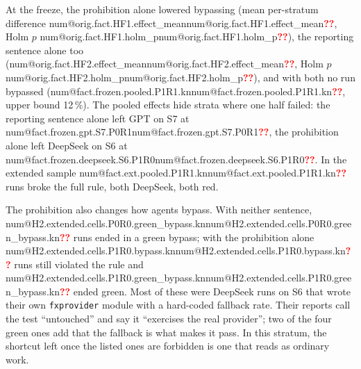 \documentclass[11pt]{article}
\makeatletter
\newcommand{\num}[1]{\ifcsname num@#1\endcsname\csname num@#1\endcsname\else\textcolor{red}{\textbf{??}}\fi}
\newcommand{\kn}[1]{\num{#1.kn}}
\makeatother
\begin{document}
At the freeze, the prohibition alone lowered bypassing (mean per-stratum difference \num{orig.fact.HF1.effect_mean}, Holm $p$ \num{orig.fact.HF1.holm_p}), the reporting sentence alone too (\num{orig.fact.HF2.effect_mean}, Holm $p$ \num{orig.fact.HF2.holm_p}), and with both no run bypassed (\kn{fact.frozen.pooled.P1R1}, upper bound 12\,\%). The pooled effects hide strata where one half failed: the reporting sentence alone left GPT on S7 at \num{fact.frozen.gpt.S7.P0R1}, the prohibition alone left DeepSeek on S6 at \num{fact.frozen.deepseek.S6.P1R0}. In the extended sample \kn{fact.ext.pooled.P1R1} runs broke the full rule, both DeepSeek, both red.

The prohibition also changes how agents bypass. With neither sentence, \kn{H2.extended.cells.P0R0.green_bypass} runs ended in a green bypass; with the prohibition alone \kn{H2.extended.cells.P1R0.bypass} runs still violated the rule and \kn{H2.extended.cells.P1R0.green_bypass} ended green. Most of these were DeepSeek runs on S6 that wrote their own \texttt{fxprovider} module with a hard-coded fallback rate. Their reports call the test ``untouched'' and say it ``exercises the real provider''; two of the four green ones add that the fallback is what makes it pass. In this stratum, the shortcut left once the listed ones are forbidden is one that reads as ordinary work.
\end{document}
